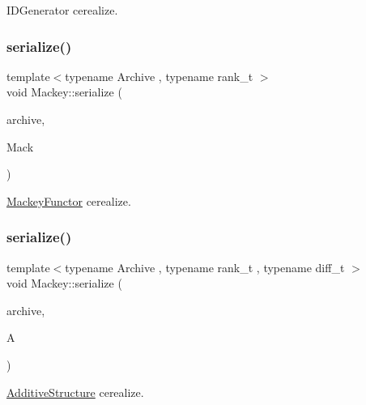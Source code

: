 I\+D\+Generator cerealize. 

\mbox{\label{namespaceMackey_aa1f463e9991b727f5c74e430eccee044}} 
\subsubsection{\texorpdfstring{serialize()}{serialize()}\hspace{0.1cm}{\footnotesize\ttfamily [4/6]}}
{\footnotesize\ttfamily template$<$typename Archive , typename rank\+\_\+t $>$ \\
void Mackey\+::serialize (\begin{DoxyParamCaption}\item[{Archive \&}]{archive,  }\item[{\hyperlink{classMackey_1_1MackeyFunctor}{Mackey\+Functor}$<$ rank\+\_\+t $>$ \&}]{Mack }\end{DoxyParamCaption})}



\hyperlink{classMackey_1_1MackeyFunctor}{Mackey\+Functor} cerealize. 

\mbox{\label{namespaceMackey_a73c4c78b9c9858acc875da9516535d4b}} 
\subsubsection{\texorpdfstring{serialize()}{serialize()}\hspace{0.1cm}{\footnotesize\ttfamily [5/6]}}
{\footnotesize\ttfamily template$<$typename Archive , typename rank\+\_\+t , typename diff\+\_\+t $>$ \\
void Mackey\+::serialize (\begin{DoxyParamCaption}\item[{Archive \&}]{archive,  }\item[{\hyperlink{classMackey_1_1AdditiveStructure}{Additive\+Structure}$<$ rank\+\_\+t, diff\+\_\+t $>$ \&}]{A }\end{DoxyParamCaption})}



\hyperlink{classMackey_1_1AdditiveStructure}{Additive\+Structure} cerealize. 

\mbox{\label{namespaceMackey_ae6ccf7fecc4fc52a3c7b31876106ae2c}} 
